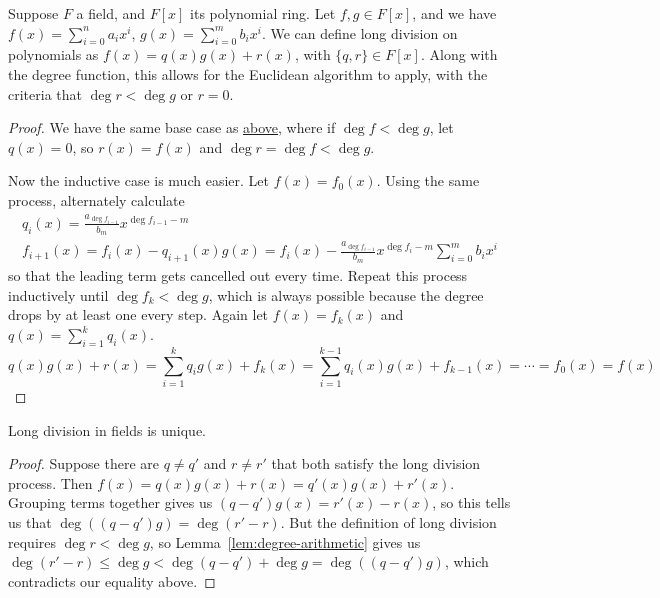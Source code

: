\begin{proposition}\label{prop:field-polynomial-long-div}
    Suppose \(F\) a field, and \(F[x]\) its polynomial ring.
    Let \(f,g \in F[x]\),
    and we have \(f(x) = \sum_{i=0}^n a_i x^i\),
    \(g(x) = \sum_{i=0}^m b_i x^i\).
    We can define long division on polynomials as
    \(f(x) = q(x)g(x) + r(x)\), with \(\{q,r\} \in F[x]\).
    Along with the degree function,
    this allows for the Euclidean algorithm to apply,
    with the criteria that \(\deg r < \deg g\) or \(r = 0\).
\end{proposition}
\begin{proof}
    We have the same base case as \hyperref[prop:ring-polynomial-long-div]{above},
    where if \(\deg f < \deg g\), let \(q(x) = 0\),
    so \(r(x) = f(x)\) and \(\deg r = \deg f < \deg g\).

    Now the inductive case is much easier.
    Let \(f(x) = f_0(x)\).
    Using the same process, alternately calculate
    \begin{gather*}
        q_i(x) = \frac{a_{\deg f_{i-1}}}{b_m} x^{\deg f_{i-1} - m} \\
        f_{i+1}(x) = f_i(x) - q_{i+1}(x)g(x)
        = f_i(x) - \frac{a_{\deg f_{i-1}}}{b_m} x^{\deg f_i - m}
        \sum_{i=0}^m b_i x^i
    \end{gather*}
    so that the leading term gets cancelled out every time.
    Repeat this process inductively until \(\deg f_k < \deg g\),
    which is always possible because the degree drops by at least one every step.
    Again let \(f(x) = f_k(x)\) and \(q(x) = \sum_{i=1}^k q_i(x)\).
    \begin{equation*}
        q(x)g(x) + r(x) = \sum_{i=1}^k q_i g(x) + f_k(x)
        = \sum_{i=1}^{k-1} q_i(x)g(x) + f_{k-1}(x)
        = \cdots = f_0(x) = f(x)
    \end{equation*}
\end{proof}
\begin{theorem}
    Long division in fields is unique.
\end{theorem}
\begin{proof}
    Suppose there are \(q \neq q'\) and \(r \neq r'\)
    that both satisfy the long division process.
    Then \(f(x) = q(x)g(x) + r(x) = q'(x)g(x) + r'(x)\).
    Grouping terms together gives us \((q-q')g(x) = r'(x) - r(x)\),
    so this tells us that \(\deg ((q-q')g) = \deg (r'-r)\).
    But the definition of long division requires \(\deg r < \deg g\),
    so Lemma~\ref{lem:degree-arithmetic} gives us
    \(\deg(r'-r) \leq \deg g < \deg(q-q') + \deg g = \deg ((q-q')g)\),
    which contradicts our equality above.
\end{proof}
